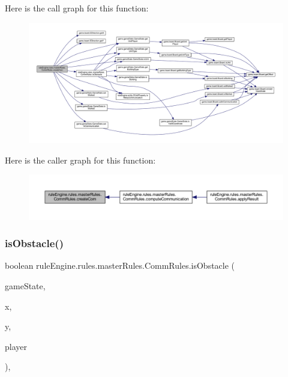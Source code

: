 Here is the call graph for this function\+:
\nopagebreak
\begin{figure}[H]
\begin{center}
\leavevmode
\includegraphics[width=350pt]{classrule_engine_1_1rules_1_1master_rules_1_1_comm_rules_a53d83ec67dede91baf381c333465c96f_cgraph}
\end{center}
\end{figure}
Here is the caller graph for this function\+:
\nopagebreak
\begin{figure}[H]
\begin{center}
\leavevmode
\includegraphics[width=350pt]{classrule_engine_1_1rules_1_1master_rules_1_1_comm_rules_a53d83ec67dede91baf381c333465c96f_icgraph}
\end{center}
\end{figure}
\mbox{\label{classrule_engine_1_1rules_1_1master_rules_1_1_comm_rules_a8ce09b7e1c34043c5a768294cbc6adcd}} 
\subsubsection{\texorpdfstring{is\+Obstacle()}{isObstacle()}}
{\footnotesize\ttfamily boolean rule\+Engine.\+rules.\+master\+Rules.\+Comm\+Rules.\+is\+Obstacle (\begin{DoxyParamCaption}\item[{\mbox{\hyperlink{classgame_1_1game_state_1_1_game_state}{Game\+State}}}]{game\+State,  }\item[{int}]{x,  }\item[{int}]{y,  }\item[{\mbox{\hyperlink{enumgame_1_1_e_player}{E\+Player}}}]{player }\end{DoxyParamCaption})\hspace{0.3cm}{\ttfamily [inline]}, {\ttfamily [private]}}

